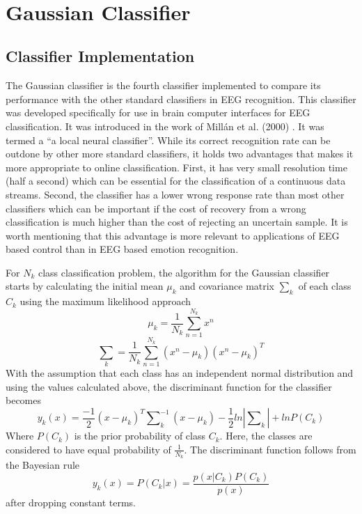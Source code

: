 \documentclass[12pt, a4paper, fleqn]{memoir}%
\begin{document}
\\

\section{Gaussian Classifier}
\label{sec:GaussianClassifier}

\subsection{Classifier Implementation}
The Gaussian classifier is the fourth classifier implemented to compare its performance with the other standard classifiers in EEG recognition. This classifier was developed specifically for use in brain computer interfaces for EEG classification. It was introduced in the work of Mill\'{a}n et al. (2000) \cite{millan2000local}. It was termed a ``a local neural classifier''. While its correct recognition rate can be outdone by other more standard classifiers, it holds two advantages that makes it more appropriate to online classification. First, it has very small resolution time (half a second) which can be essential for the classification of a continuous data streams. Second, the classifier has a lower wrong response rate than most other classifiers which can be important if the cost of recovery from a wrong classification is much higher than the cost of rejecting an uncertain sample. It is worth mentioning that this advantage is more relevant to applications of EEG based control than in EEG based emotion recognition.

For $N_k$ class classification problem, the algorithm for the Gaussian classifier starts by calculating the initial mean $\mu_k$ and covariance matrix $\sum_k$ of each class $C_k$ using the maximum likelihood approach
\begin{equation} \label{eq:mean}
	\mu_k = \frac{1}{N_k}\sum_{n=1}^{N_k}x^n
\end{equation}
\begin{equation} \label{eq:cov}
	\sum_k = \frac{1}{N_k}\sum_{n=1}^{N_k}(x^n - \mu_k)(x^n - \mu_k)^T
\end{equation}
With the assumption that each class has an independent normal distribution and using the values calculated above, the discriminant function for the classifier becomes
\begin{equation} \label{eq:yk}
	y_k(x) = \frac{-1}{2}(x - \mu_k)^T\sum\nolimits_k^{-1}(x-\mu_k)-\frac{1}{2}ln|\sum\nolimits_k|+lnP(C_k)
\end{equation}
Where $P(C_k)$ is the prior probability of class $C_k$. Here, the classes are considered to have equal probability of $\frac{1}{N_k}$. The discriminant function follows from the Bayesian rule
$$y_k(x) = P(C_k|x) = \frac{p(x|C_k)P(C_k)}{p(x)}$$
after dropping constant terms.
\end{document}
